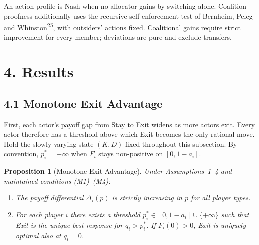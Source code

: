 \documentclass[12pt]{article}
\newtheorem{proposition}{Proposition}
\theoremstyle{definition}
\theoremstyle{remark}
\begin{document}
An action profile is Nash when no allocator gains by switching alone. Coalition-proofness additionally uses the recursive self-enforcement test of Bernheim, Peleg and Whinston\textsuperscript{25}, with outsiders' actions fixed. Coalitional gains require strict improvement for every member; deviations are pure and exclude transfers.



\section{4. Results}

\subsection{4.1 Monotone Exit Advantage}

First, each actor's payoff gap from Stay to Exit widens as more actors exit. Every actor therefore has a threshold above which Exit becomes the only rational move. Hold the slowly varying state $(K, D)$ fixed throughout this subsection. By convention, $p_i^*=+\infty$ when $F_i$ stays non-positive on $[0,1-a_i]$.

\begin{proposition}[Monotone Exit Advantage]
Under Assumptions~1--4 and maintained conditions (M1)--(M4):

\begin{enumerate}[label=(\roman*)]
\item The payoff differential $\Delta_i(p)$ is strictly increasing
in $p$ for all player types.
\item For each player $i$ there exists a threshold
$p_i^*\in[0,1-a_i]\cup\{+\infty\}$ such that Exit is the unique
best response for $q_i>p_i^*$. If $F_i(0)>0$, Exit is uniquely optimal also at $q_i=0$.
\end{enumerate}
\end{proposition}
\end{document}
